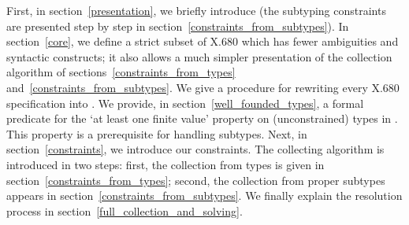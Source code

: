First, in section~\ref{presentation}, we briefly introduce \ASN (the
subtyping constraints are presented step by step in
section~\ref{constraints_from_subtypes}). In section~\ref{core}, we
define a strict subset of \mbox{X.680} which has fewer ambiguities and
syntactic constructs; it also allows a much simpler presentation of
the collection algorithm of sections~\ref{constraints_from_types}
and~\ref{constraints_from_subtypes}. We give a procedure for rewriting
every \mbox{X.680} specification into \core. We provide, in
section~\ref{well_founded_types}, a formal predicate for the `at least
one finite value' property on (unconstrained) types in \core. This
property is a prerequisite for handling subtypes. Next, in
section~\ref{constraints}, we introduce our constraints. The
collecting algorithm is introduced in two steps: first, the collection
from types is given in section~\ref{constraints_from_types}; second,
the collection from proper subtypes appears in
section~\ref{constraints_from_subtypes}. We finally explain the
resolution process in section~\ref{full_collection_and_solving}.
